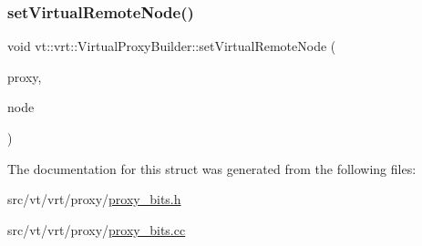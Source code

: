 \mbox{\label{structvt_1_1vrt_1_1_virtual_proxy_builder_afc8a88f9e489dcf37e925ae1b0442128}} 
\subsubsection{\texorpdfstring{set\+Virtual\+Remote\+Node()}{setVirtualRemoteNode()}}
{\footnotesize\ttfamily void vt\+::vrt\+::\+Virtual\+Proxy\+Builder\+::set\+Virtual\+Remote\+Node (\begin{DoxyParamCaption}\item[{\hyperlink{namespacevt_a1b417dd5d684f045bb58a0ede70045ac}{Virtual\+Proxy\+Type} \&}]{proxy,  }\item[{\hyperlink{namespacevt_a866da9d0efc19c0a1ce79e9e492f47e2}{Node\+Type} const \&}]{node }\end{DoxyParamCaption})\hspace{0.3cm}{\ttfamily [static]}}



The documentation for this struct was generated from the following files\+:\begin{DoxyCompactItemize}
\item 
src/vt/vrt/proxy/\hyperlink{vrt_2proxy_2proxy__bits_8h}{proxy\+\_\+bits.\+h}\item 
src/vt/vrt/proxy/\hyperlink{vrt_2proxy_2proxy__bits_8cc}{proxy\+\_\+bits.\+cc}\end{DoxyCompactItemize}
